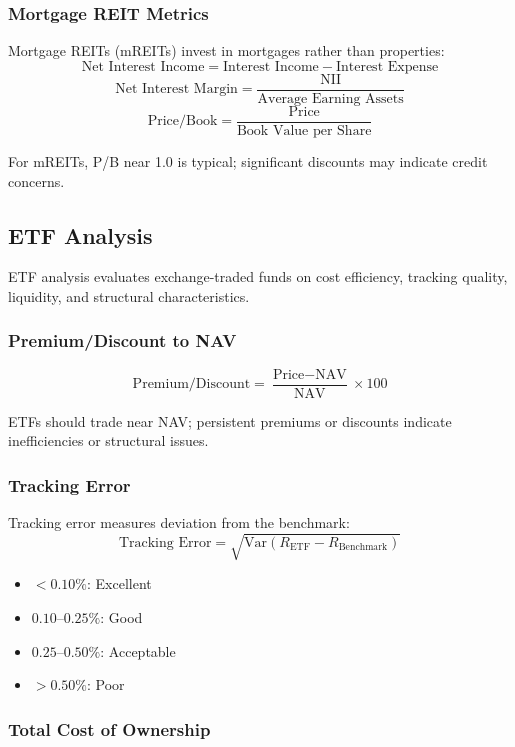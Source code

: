 \subsubsection{Mortgage REIT Metrics}

Mortgage REITs (mREITs) invest in mortgages rather than properties:
\[
\text{Net Interest Income} = \text{Interest Income} - \text{Interest Expense}
\]
\[
\text{Net Interest Margin} = \frac{\text{NII}}{\text{Average Earning Assets}}
\]
\[
\text{Price/Book} = \frac{\text{Price}}{\text{Book Value per Share}}
\]

For mREITs, P/B near 1.0 is typical; significant discounts may indicate credit concerns.

\newpage\subsection{ETF Analysis}

ETF analysis evaluates exchange-traded funds on cost efficiency, tracking quality, liquidity, and structural characteristics.

\subsubsection{Premium/Discount to NAV}

\[
\text{Premium/Discount} = \frac{\text{Price} - \text{NAV}}{\text{NAV}} \times 100
\]

ETFs should trade near NAV; persistent premiums or discounts indicate inefficiencies or structural issues.

\subsubsection{Tracking Error}

Tracking error measures deviation from the benchmark:
\[
\text{Tracking Error} = \sqrt{\text{Var}(R_{\text{ETF}} - R_{\text{Benchmark}})}
\]

\begin{itemize}
  \item[] $< 0.10\%$: Excellent
  \item[] $0.10$--$0.25\%$: Good
  \item[] $0.25$--$0.50\%$: Acceptable
  \item[] $> 0.50\%$: Poor
\end{itemize}

\subsubsection{Total Cost of Ownership}

